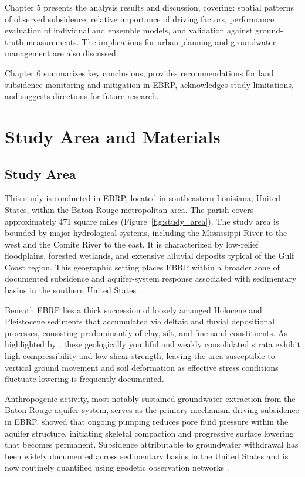 \documentclass[oneside,doublespacing,flushright]{lsuthesis}
\begin{document}
Chapter 5 presents the analysis results and discussion, covering: spatial patterns of observed subsidence, relative importance of driving factors, performance evaluation of individual and ensemble models, and validation against ground-truth measurements. The implications for urban planning and groundwater management are also discussed.

Chapter 6 summarizes key conclusions, provides recommendations for land subsidence monitoring and mitigation in EBRP, acknowledges study limitations, and suggests directions for future research.


\chapter{Study Area and Materials}

\section{Study Area}

This study is conducted in EBRP, located in southeastern Louisiana, United States, within the Baton Rouge metropolitan area. 
The parish covers approximately 471 square miles (Figure~\ref{fig:study_area}).
The study area is bounded by major hydrological systems, including the Mississippi 
River to the west and the Comite River to the east.
It is characterized by low-relief floodplains, forested wetlands, and extensive 
alluvial deposits typical of the Gulf Coast region.
This geographic setting places EBRP within a broader zone of 
documented subsidence and aquifer-system response associated with sedimentary basins 
in the southern United States \citep{HosseinzadehLLand2024}.

Beneath EBRP lies a thick succession of loosely arranged Holocene and Pleistocene sediments that accumulated via deltaic and fluvial depositional processes, consisting predominantly of clay, silt, 
and fine sand constituents. As highlighted by \citet{Higgins2016}, these geologically youthful and weakly consolidated strata exhibit high 
compressibility and low shear strength, leaving the area susceptible to vertical ground 
movement and soil deformation as effective stress conditions fluctuate
lowering is frequently documented.

Anthropogenic activity, most notably sustained groundwater extraction from the Baton Rouge aquifer system, serves as the primary mechanism driving subsidence in EBRP. \citet{HosseinzadehLLand2024} showed that ongoing pumping reduces pore fluid pressure 
within the aquifer structure, initiating skeletal compaction and progressive surface lowering that
becomes permanent. Subsidence attributable to groundwater withdrawal has been widely documented across sedimentary basins in the United States and is now routinely quantified using geodetic observation networks \citep{Higgins2016}.
\end{document}
